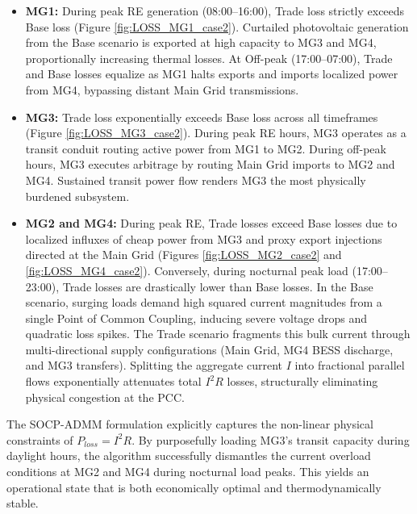 \documentclass[preprint,12pt]{elsarticle}
\begin{document}
    \begin{itemize}
        \item \textbf{MG1:} During peak RE generation (08:00--16:00), Trade loss strictly exceeds Base loss (Figure \ref{fig:LOSS_MG1_case2}). Curtailed photovoltaic generation from the Base scenario is exported at high capacity to MG3 and MG4, proportionally increasing thermal losses. At Off-peak (17:00--07:00), Trade and Base losses equalize as MG1 halts exports and imports localized power from MG4, bypassing distant Main Grid transmissions.
        
        \item \textbf{MG3:} Trade loss exponentially exceeds Base loss across all timeframes (Figure \ref{fig:LOSS_MG3_case2}). During peak RE hours, MG3 operates as a transit conduit routing active power from MG1 to MG2. During off-peak hours, MG3 executes arbitrage by routing Main Grid imports to MG2 and MG4. Sustained transit power flow renders MG3 the most physically burdened subsystem.
        
        \item \textbf{MG2 and MG4:} During peak RE, Trade losses exceed Base losses due to localized influxes of cheap power from MG3 and proxy export injections directed at the Main Grid (Figures \ref{fig:LOSS_MG2_case2} and \ref{fig:LOSS_MG4_case2}). Conversely, during nocturnal peak load (17:00--23:00), Trade losses are drastically lower than Base losses. In the Base scenario, surging loads demand high squared current magnitudes from a single Point of Common Coupling, inducing severe voltage drops and quadratic loss spikes. The Trade scenario fragments this bulk current through multi-directional supply configurations (Main Grid, MG4 BESS discharge, and MG3 transfers). Splitting the aggregate current $I$ into fractional parallel flows exponentially attenuates total $I^2R$ losses, structurally eliminating physical congestion at the PCC.
    \end{itemize}

    The SOCP-ADMM formulation explicitly captures the non-linear physical constraints of $P_{loss} = I^2R$. By purposefully loading MG3's transit capacity during daylight hours, the algorithm successfully dismantles the current overload conditions at MG2 and MG4 during nocturnal load peaks. This yields an operational state that is both economically optimal and thermodynamically stable.
\end{document}
